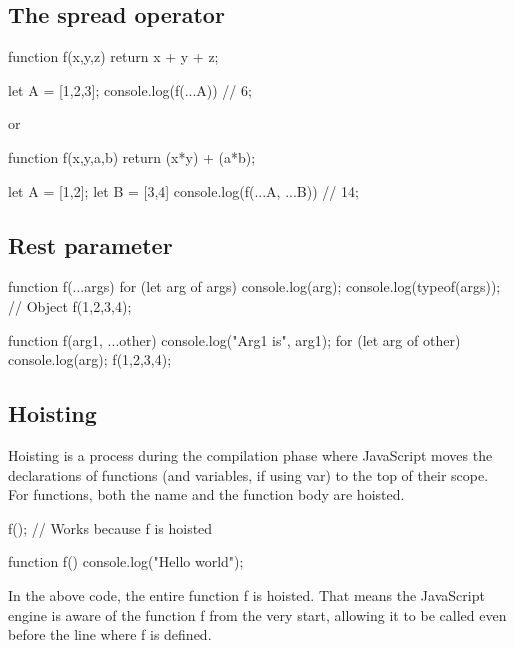 \documentclass{report}
\begin{document}
    \bigbreak \noindent 
    \subsection{The spread operator}
    \bigbreak \noindent 
    \begin{jscode}
        function f(x,y,z) {
            return x + y + z;
        }

        let A = [1,2,3];
        console.log(f(...A)) // 6;
    \end{jscode}
    \bigbreak \noindent 
    or
    \bigbreak \noindent 
    \begin{jscode}
        function f(x,y,a,b) {
            return (x*y) + (a*b);
        }

        let A = [1,2];
        let B = [3,4]
        console.log(f(...A, ...B)) // 14;
    \end{jscode}

    \bigbreak \noindent 
    \subsection{Rest parameter}
    \bigbreak \noindent 
    \begin{jscode}
        function f(...args) {
            for (let arg of args) {
                console.log(arg);
            }
            console.log(typeof(args)); // Object
        }
        f(1,2,3,4);
    \end{jscode}
    \bigbreak \noindent 
    \begin{jscode}
        function f(arg1, ...other) {
            console.log("Arg1 is", arg1);
            for (let arg of other) {
                console.log(arg);
            }
        }
        f(1,2,3,4);
    \end{jscode}

    \bigbreak \noindent 
    \subsection{Hoisting}
    \bigbreak \noindent 
    Hoisting is a process during the compilation phase where JavaScript moves the declarations of functions (and variables, if using var) to the top of their scope. For functions, both the name and the function body are hoisted.
    \bigbreak \noindent 
    \begin{jscode}
        f(); // Works because f is hoisted

        function f() {
            console.log("Hello world");
        }
    \end{jscode}
    \bigbreak \noindent 
    In the above code, the entire function f is hoisted. That means the JavaScript engine is aware of the function f from the very start, allowing it to be called even before the line where f is defined.
    \bigbreak \noindent 
\end{document}
